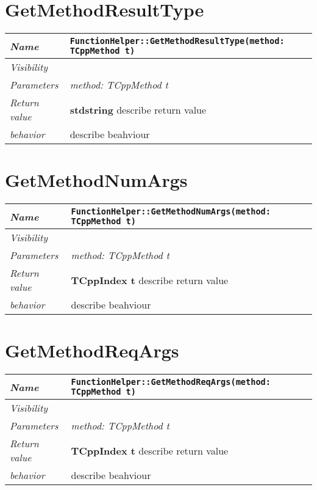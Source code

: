  \section{GetMethodResultType}
\begin{longtable}{p{3cm} @{\hskip 1cm} p{12cm}}
 \hline
\textit{Name} & \texttt{FunctionHelper::GetMethodResultType(method: TCppMethod t)}\\
\hline
 \textit{Visibility} & \\
\hline
\textit{Parameters} & \textit{method: TCppMethod t}\\
\hline
\textit{Return value} & \textbf{ stdstring} describe return value\\
  \hline
 \textit{behavior} & describe beahviour \\
\hline
\end{longtable} \pagebreak
 \section{GetMethodNumArgs}
\begin{longtable}{p{3cm} @{\hskip 1cm} p{12cm}}
 \hline
\textit{Name} & \texttt{FunctionHelper::GetMethodNumArgs(method: TCppMethod t)}\\
\hline
 \textit{Visibility} & \\
\hline
\textit{Parameters} & \textit{method: TCppMethod t}\\
\hline
\textit{Return value} & \textbf{ TCppIndex t} describe return value\\
  \hline
 \textit{behavior} & describe beahviour \\
\hline
\end{longtable} \pagebreak
 \section{GetMethodReqArgs}
\begin{longtable}{p{3cm} @{\hskip 1cm} p{12cm}}
 \hline
\textit{Name} & \texttt{FunctionHelper::GetMethodReqArgs(method: TCppMethod t)}\\
\hline
 \textit{Visibility} & \\
\hline
\textit{Parameters} & \textit{method: TCppMethod t}\\
\hline
\textit{Return value} & \textbf{ TCppIndex t} describe return value\\
  \hline
 \textit{behavior} & describe beahviour \\
\hline
\end{longtable} \pagebreak
